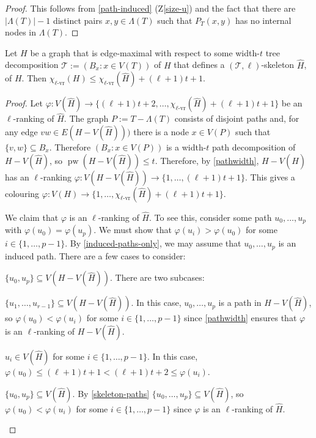 \documentclass[kpfonts]{patmorin}
\DeclareMathOperator{\pw}{pw}
\newcommand{\rn}[1]{\chi_{\operatorname{#1-vr}}}
\newcommand{\lrn}{\rn{\ell}}
\theoremstyle{named}
\begin{document}
\begin{proof}
    This follows from \cref{path-induced} (Z\ref{size-u}) and the fact that there are $|\Lambda(T)|-1$ distinct pairs $x,y\in\Lambda(T)$ such that $P_T(x,y)$ has no internal nodes in $\Lambda(T)$.
\end{proof}


\begin{lem}\label{skeleton-colour}
    Let $H$ be a graph that is edge-maximal with respect to some width-$t$ tree decomposition $\mathcal{T}:=(B_x:x\in V(T))$ of $H$ that defines a $(\mathcal{T},\ell)$-skeleton $\hat{H}$, of $H$.  Then $\lrn(H)\le \lrn(\hat{H}) + (\ell+1)t+1$.
\end{lem}

\begin{proof}
    Let $\varphi:V(\hat{H})\to \{(\ell+1)t+2,\ldots,\lrn(\hat{H})+(\ell+1)t+1\}$ be an $\ell$-ranking of $\hat{H}$. The graph $P:=T-\Lambda(T)$ consists of disjoint paths and, for any edge $vw\in E(H-V(\hat{H})))$ there is a node $x\in V(P)$ such that $\{v,w\}\subseteq B_x$.  Therefore $(B_x:x\in V(P))$ is a width-$t$ path decomposition of $H-V(\hat{H})$, so $\pw(H-V(\hat{H}))\le t$.  Therefore, by \cref{pathwidth}, $H-V(\hat{H})$ has an $\ell$-ranking $\varphi:V(H-V(\hat{H}))\to\{1,\ldots,(\ell+1)t+1\}$.  This gives a colouring $\varphi: V(H)\to\{1,\ldots,\lrn(\hat{H})+(\ell+1)t+1\}$.

    We claim that $\varphi$ is an $\ell$-ranking of $\hat{H}$.  To see this, consider some path $u_0,\ldots,u_p$ with $\varphi(u_0)=\varphi(u_p)$.  We must show that $\varphi(u_i)>\varphi(u_0)$ for some $i\in\{1,\ldots,p-1\}$.
    By \cref{induced-paths-only}, we may assume that $u_0,\ldots,u_p$ is an induced path. There are a few cases to consider:
    \begin{compactenum}
        \item $\{u_0,u_p\}\subseteq V(H-V(\hat{H}))$. There are two subcases:
        \begin{compactenum}
            \item $\{u_1,\ldots,u_{r-1}\}\subseteq V(H-V(\hat{H}))$.  In this case, $u_0,\ldots,u_p$ is a path in $H-V(\hat{H})$, so  $\varphi(u_0)<\varphi(u_i)$ for some $i\in\{1,\ldots,p-1\}$ since \cref{pathwidth} ensures that $\varphi$ is an $\ell$-ranking of $H-V(\hat{H})$.

            \item $u_i\in V(\hat{H})$ for some $i\in\{1,\ldots,p-1\}$. In this case, $\varphi(u_0)\le (\ell+1)t+1 < (\ell+1)t+2 \le \varphi(u_i)$.
        \end{compactenum}
        \item $\{u_0,u_p\}\subseteq V(\hat{H})$.
        By \cref{skeleton-paths}  $\{u_0,\ldots,u_p\}\subseteq V(\hat{H})$, so  $\varphi(u_0)<\varphi(u_i)$ for some $i\in\{1,\ldots,p-1\}$ since $\varphi$ is an $\ell$-ranking of $\hat{H}$. \qedhere
    \end{compactenum}
\end{proof}
\end{document}
